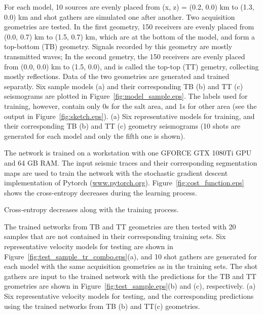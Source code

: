 \documentclass{segabs}
\begin{document}
For each model, 10 sources are evenly placed from (x, z) = (0.2, 0.0) km to (1.3, 0.0) km and shot gathers are simulated one after another. 
Two acquisition geometries are tested. In the first geometry, 150 receivers are evenly placed from (0.0, 0.7) km to (1.5, 0.7) km, which are at the bottom of the model, and form a top-bottom (TB) geometry. Signals recorded by this geometry are mostly transmitted waves;
In the second gemetry, the 150 receivers are evenly placed from (0.0, 0.0) km to (1.5, 0.0), and is called the top-top (TT) gemetry, collecting mostly reflections. Data of the two geometries are generated and trained separatly.  
Six sample models (a) and their corresponding TB (b) and TT (c) seismograms are plotted in Figure~\ref{fig:model_sample.eps}. The labels used for training, however, contain only 0s for the salt area, and 1s for other area (see the output in Figure~\ref{fig:sketch.eps}). 
{(a) Six representative models for training, and their corresponding TB (b) and TT (c) geometry seismograms (10 shots are generated for each model and only the fifth one is shown).}

The network is trained on a workstation with one GFORCE GTX 1080Ti GPU and 64 GB RAM. The input seismic traces and their corresponding segmentation maps are used to train the network with the stochastic gradient descent implementation of Pytorch (\url{www.pytorch.org}). Figure~\ref{fig:cost_function.eps} shows the cross-entropy decreases during the learning process.

{Cross-entropy decreases along with the training process.}

The trained networks from TB and TT geometries are then tested with 20 samples that are not contained in their corresponding training sets. Six representative velocity models for testing are shown in Figure~\ref{fig:test_sample_tr_combo.eps}(a), and 10 shot gathers are generated for each model with the same acquisition geometries as in the training sets. The shot gathers are input to the trained network with the predictions for the TB and TT geometries are shown in Figure~\ref{fig:test_sample.eps}(b) and (c), respectively.
{(a) Six representative velocity models for testing, and the corresponding predictions using the trained networks from TB (b) and TT(c) geometries.}
\end{document}

